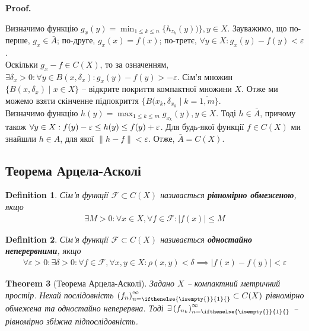\documentclass[a4paper, 10pt]{article}
\makeatletter
\theoremstyle{theoremdd}
\newtheorem{theorem}{Theorem}[subsection]
\theoremstyle{theoremdd}
\newtheorem{definition}[theorem]{Definition}
\theoremstyle{theoremdd}
\theoremstyle{theoremdd}
\theoremstyle{theoremdd}
\theoremstyle{theoremdd}
\theoremstyle{theoremdd}
\theoremstyle{theoremdd}
\newcommand{\sequence}[2][]{\left({#2}\right)_{n=\ifthenelse{\isempty{#1}}{1}{#1}}^{\infty}}
\renewenvironment{proof}[1][Proof.\\]{\par
\pushQED{\hfill \qed}%
\normalfont \topsep6\p@\@plus6\p@\relax
\trivlist
\item\relax
{\bfseries
#1\@addpunct{.}}\hspace\labelsep\ignorespaces
}{%
\popQED\endtrivlist\@endpefalse
}
\makeatother
\begin{document}
\begin{proof}
Визначимо функцію $g_x(y) = \displaystyle\min_{1 \leq k \leq n} \{h_{z_k}(y))\}, y \in X$. Зауважимо, що по-перше, $g_x \in \bar{A}$; по-друге, $g_x(x) = f(x)$; по-третє, $\forall y \in X: g_x(y) -f(y) < \varepsilon$.\\
Оскільки $g_x - f \in C(X)$, то за означенням, $\exists \delta_x > 0: \forall y \in B(x,\delta_x): g_x(y) - f(y) > - \varepsilon$. Сім'я множин $\{B(x,\delta_x) \mid x \in X \}$ -- відкрите покриття компактної множини $X$. Отже ми можемо взяти скінченне підпокриття $\{B(x_k,\delta_{x_k} \mid k = \overline{1,m}\}$.\\
Визначимо функцію $h(y) = \displaystyle\max_{1 \leq k \leq m} g_{x_k}(y), y \in X$. Тоді $h \in \bar{A}$, причому також $\forall y \in X: \\ f(y) - \varepsilon \leq h(y) \leq f(y) + \varepsilon$. Для будь-якої функції $f \in C(X)$ ми знайшли $h \in A$, для якої $\|h - f\| < \varepsilon$. Отже, $\bar{A} = C(X)$.
\end{proof}

\subsection{Теорема Арцела-Асколі}
\begin{definition}
Сім'я функції $\mathcal{F} \subset C(X)$ називається \textbf{рівномірно обмеженою}, якщо
\begin{align*}
\exists M > 0: \forall x \in X, \forall f \in \mathcal{F}: |f(x)| \leq M
\end{align*}
\end{definition}

\begin{definition}
Сім'я функції $\mathcal{F} \subset C(X)$ називається \textbf{одностайно неперервними}, якщо
\begin{align*}
\forall \varepsilon > 0: \exists \delta > 0: \forall f \in \mathcal{F}, \forall x,y \in X: \rho(x,y) < \delta \implies |f(x) - f(y)| < \varepsilon
\end{align*}
\end{definition}

\begin{theorem}[Теорема Арцела-Асколі]
Задано $X$ -- компактний метричний простір. Нехай послідовність $\sequence{f_n} \subset C(X)$ рівномірно обмежена та одностайно неперервна. Тоді $\exists \sequence{f_{n_k}}$ -- рівномірно збіжна підпослідовність.
\end{theorem}
\end{document}

